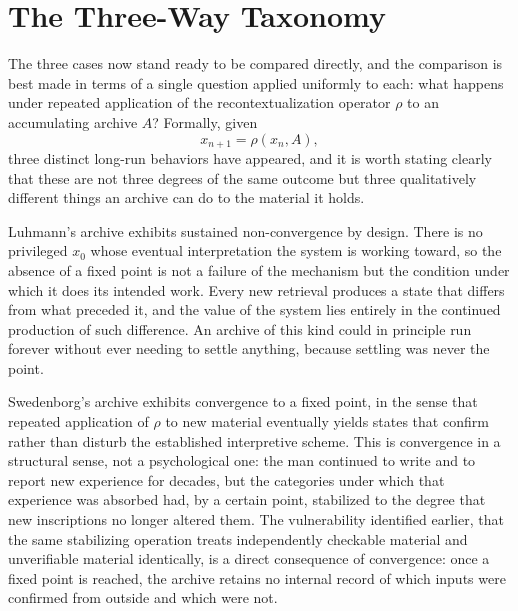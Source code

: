 \documentclass[11pt]{article}
\begin{document}
\section{The Three-Way Taxonomy}

The three cases now stand ready to be compared directly, and the comparison is best made in terms of a single question applied uniformly to each: what happens under repeated application of the recontextualization operator $\rho$ to an accumulating archive $A$? Formally, given
\[
x_{n+1} = \rho(x_n, A),
\]
three distinct long-run behaviors have appeared, and it is worth stating clearly that these are not three degrees of the same outcome but three qualitatively different things an archive can do to the material it holds.

Luhmann's archive exhibits sustained non-convergence by design. There is no privileged $x_0$ whose eventual interpretation the system is working toward, so the absence of a fixed point is not a failure of the mechanism but the condition under which it does its intended work. Every new retrieval produces a state that differs from what preceded it, and the value of the system lies entirely in the continued production of such difference. An archive of this kind could in principle run forever without ever needing to settle anything, because settling was never the point.

Swedenborg's archive exhibits convergence to a fixed point, in the sense that repeated application of $\rho$ to new material eventually yields states that confirm rather than disturb the established interpretive scheme. This is convergence in a structural sense, not a psychological one: the man continued to write and to report new experience for decades, but the categories under which that experience was absorbed had, by a certain point, stabilized to the degree that new inscriptions no longer altered them. The vulnerability identified earlier, that the same stabilizing operation treats independently checkable material and unverifiable material identically, is a direct consequence of convergence: once a fixed point is reached, the archive retains no internal record of which inputs were confirmed from outside and which were not.
\end{document}
